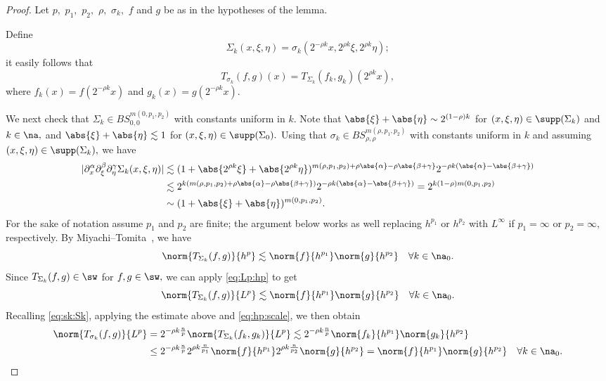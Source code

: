 \begin{proof} Let $p,$ $p_1,$ $p_2,$  $\rho,$  $\sigma_k,$ $f$ and $g$ be as in the hypotheses of the lemma.  

Define
\[
\Sigma_k(x,\xi,\eta)=\sigma_k(2^{-\rho k}x, 2^{\rho k}\xi, 2^{\rho k} \eta);
\]
it easily follows that 
\begin{equation}\label{eq:sk:Sk}
T_{\sigma_k}(f,g)(x)=T_{\Sigma_k} (f_k,g_k)(2^{\rho k}x),
\end{equation}
where $f_k(x)=f(2^{-\rho k}x)$ and $g_k(x)=g(2^{-\rho k}x).$ 

We next check that $\Sigma_k\in BS^{m(0,p_1,p_2)}_{0,0}$ with constants uniform in $k.$ Note that $\abs{\xi}+\abs{\eta}\sim 2^{(1-\rho)k}$ for $(x,\xi,\eta)\in \supp(\Sigma_k)$ and $k\in\na,$ and $\abs{\xi}+\abs{\eta}\lesssim 1$ for $(x,\xi,\eta)\in \supp(\Sigma_0).$ Using that $\sigma_k\in BS^{m(\rho,p_1,p_2)}_{\rho,\rho}$ with constants uniform in $k$ and assuming $(x,\xi,\eta)\in \supp(\Sigma_k),$ we have  
\begin{align*}
|\partial_x^\alpha\partial^\beta_\xi\partial^\gamma_\eta \Sigma_k(x,\xi, \eta)|&\lesssim (1+\abs{2^{\rho k}\xi}+\abs{2^{\rho k}\eta})^{m(\rho,p_1,p_2)+\rho\abs{\alpha}-\rho\abs{\beta+\gamma}}2^{-\rho k(\abs{\alpha}-\abs{\beta+\gamma})}\\
&\lesssim 2^{k(m(\rho,p_1,p_2)+\rho\abs{\alpha}-\rho\abs{\beta+\gamma})}2^{-\rho k(\abs{\alpha}-\abs{\beta+\gamma})}=2^{k(1-\rho)m(0,p_1,p_2)}\\
&\sim (1+\abs{\xi}+\abs{\eta})^{m(0,p_1,p_2)}.
\end{align*}
For the sake of notation assume $p_1$ and $p_2$ are finite; the argument below works as well replacing $h^{p_1}$ or $h^{p_2}$ with $L^\infty$ if $p_1=\infty$ or $p_2=\infty,$ respectively.  By Miyachi--Tomita~\cite[Theorem 1.1]{MR3179688}, we have  
\begin{equation*}
\norm{T_{\Sigma_k}(f,g)}{h^p}\lesssim \norm{f}{h^{p_1}}\norm{g}{h^{p_2}}\quad \forall k\in\na_0.
\end{equation*}
Since $T_{\Sigma_k}(f,g)\in \sw$ for $f,g\in\sw,$ we can apply \eqref{eq:Lp:hp} to get 
\begin{equation*}
\norm{T_{\Sigma_k}(f,g)}{L^p}\lesssim \norm{f}{h^{p_1}}\norm{g}{h^{p_2}}\quad \forall k\in\na_0.
\end{equation*}
Recalling \eqref{eq:sk:Sk}, applying the estimate above and \eqref{eq:hp:scale}, we then obtain
\begin{align*}
\norm{T_{\sigma_k}(f,g)}{L^p}&=2^{-\rho k \frac{n}{p}}\norm{T_{\Sigma_k}(f_k,g_k)}{L^p}\lesssim 2^{-\rho k \frac{n}{p}} \norm{f_k}{h^{p_1}}\norm{g_k}{h^{p_2}}\\
&\le  2^{-\rho k \frac{n}{p}} 2^{\rho k \frac{n}{p_1}}\norm{f}{h^{p_1}} 2^{\rho k \frac{n}{p_2}}\norm{g}{h^{p_2}}=\norm{f}{h^{p_1}} \norm{g}{h^{p_2}} \quad \forall k\in\na_0. 
\end{align*}
\end{proof}




